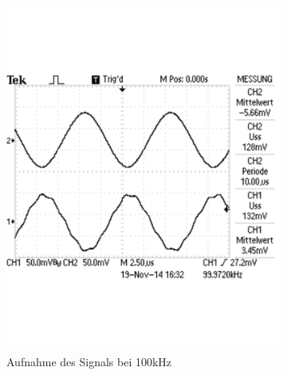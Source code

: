 \documentclass[12pt,a4paper]{article}
\begin{document}
\begin{figure}[H]
\begin{subfigure}[b]{0.28\textwidth}
                \includegraphics[width=\textwidth , scale = 0.4]{2_4_1_100k.pdf}
                \caption[Aufnahme des Signals bei 100kHz]{Aufnahme des Signals bei 100kHz}
                \label{fig:2_4_1_100k}
        \end{subfigure}
        \hfill
        \begin{subfigure}[b]{0.28\textwidth}

\end{subfigure}
\end{figure}
\end{document}
